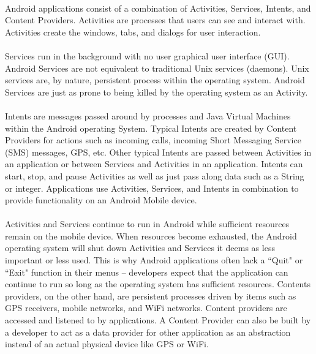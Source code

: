 		\paragraph{} Android applications consist of a combination of Activities, Services, Intents, and Content Providers.  Activities are processes that users can see and interact with. Activities create the windows, tabs, and dialogs for user interaction.  
		\paragraph{}Services run in the background with no user graphical user interface (GUI). Android Services are not equivalent to traditional Unix services (daemons).  Unix services are, by nature, persistent process within the operating system.  Android Services are just as prone to being killed by the operating system as an Activity. 
		\paragraph{}Intents are messages passed around by processes and Java Virtual Machines within the Android operating System. Typical Intents are created by Content Providers for actions such as incoming calls, incoming Short Messaging Service (SMS) messages, GPS, etc.  Other typical Intents are passed between Activities in an application or between Services and Activities in an application.  Intents can start, stop, and pause Activities as well as just pass along data such as a String or integer. Applications use Activities, Services, and Intents in combination to provide functionality on an Android Mobile device.  
		\paragraph{} Activities and Services continue to run in Android while sufficient resources remain on the mobile device.  When resources become exhausted, the Android operating system will shut down Activities and Services it deems as less important or less used.  This is why Android applications often lack a ``Quit" or ``Exit" function in their menus -- developers expect that the application can continue to run so long as the operating system has sufficient resources.  Contents providers, on the other hand, are persistent processes driven by items such as GPS receivers, mobile networks, and WiFi networks.  Content providers are accessed and listened to by applications.  A Content Provider can also be built by a developer to act as a data provider for other application as an abstraction instead of an actual physical device like GPS or WiFi.\cite{murphy_busy_2010}


